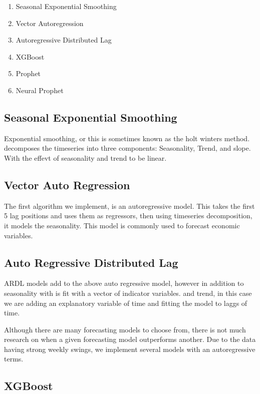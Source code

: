 \documentclass[16pt,twocolumn,letterpaper]{article}
\begin{document}
\begin{enumerate}

\item Seasonal Exponential Smoothing
\item Vector Autoregression
\item Autoregressive Distributed Lag
\item XGBoost 
\item Prophet
\item Neural Prophet
\end{enumerate}

\subsection{Seasonal Exponential Smoothing}

Exponential smoothing, or this is sometimes known as the holt winters method. decomposes the timeseries into three components: Seasonality, Trend, and slope. With the effevt of seasonality and trend to be linear. \cite{hyndman2018forecasting}

\subsection{Vector Auto Regression}

The first algorithm we implement, is an autoregressive model. This takes the first 5 lag positions and uses them as regressors, then using timeseries decomposition, it models the seasonality. This model is commonly used to forecast economic variables. 

\subsection{Auto Regressive Distributed Lag}

ARDL models add to the above auto regressive model, however in addition to seasonality with is fit with a vector of indicator variables. and trend, in this case we are adding an explanatory variable of time and fitting the model to laggs of time.

Although there are many forecasting models to choose from, there is not much research on when a given forecasting model outperforms another. Due to the data having strong weekly swings, we implement several models with an autoregressive terms.


\subsection{XGBoost}
\end{document}

